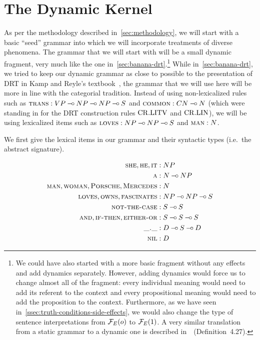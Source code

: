 \minitoc


\section{The Dynamic Kernel}

As per the methodology described in~\ref{sec:methodology}, we will start
with a basic ``seed'' grammar into which we will incorporate treatments of
diverse phenomena. The grammar that we will start with will be a small
dynamic fragment, very much like the one
in~\ref{sec:banana-drt}.\footnote{We could have also started with a more
  basic fragment without any effects and add dynamics separately. However,
  adding dynamics would force us to change almost all of the fragment:
  every individual meaning would need to add its referent to the context
  and every propositional meaning would need to add the proposition to the
  context. Furthermore, as we have seen
  in~\ref{ssec:truth-conditions-side-effects}, we would also change the
  type of sentence interpretations from $\mathcal{F}_E(o)$ to $\mathcal{F}_E(1)$. A very
  similar translation from a static grammar to a dynamic one is described
  in~\cite{lebedeva2012expression}~(Definition~4.27).} While
in~\ref{sec:banana-drt}, we tried to keep our dynamic grammar as close to
possible to the presentation of DRT in Kamp and Reyle's
textbook~\cite{kamp1993discourse}, the grammar that we will use here will
be more in line with the categorial tradition. Instead of using
non-lexicalized rules such as $\textsc{trans} : VP \mathbin{{-}\mkern-3.5mu{\circ}} NP \mathbin{{-}\mkern-3.5mu{\circ}} NP \mathbin{{-}\mkern-3.5mu{\circ}} S$
and $\textsc{common} : CN \mathbin{{-}\mkern-3.5mu{\circ}} N$ (which were standing in for the DRT
construction rules $\mathrm{CR.LITV}$ and $\mathrm{CR.LIN}$), we will be using lexicalized
items such as $\textsc{loves} : NP \mathbin{{-}\mkern-3.5mu{\circ}} NP \mathbin{{-}\mkern-3.5mu{\circ}} S$ and $\textsc{man} : N$.

We first give the lexical items in our grammar and their syntactic types
(i.e.\ the abstract signature).

\begin{align*}
  \textsc{she}, \textsc{he}, \textsc{it} &: NP \\
  \textsc{a} &: N \mathbin{{-}\mkern-3.5mu{\circ}} NP \\
  \textsc{man}, \textsc{woman}, \textsc{Porsche}, \textsc{Mercedes} &: N \\
  \textsc{loves}, \textsc{owns}, \textsc{fascinates} &: NP \mathbin{{-}\mkern-3.5mu{\circ}} NP \mathbin{{-}\mkern-3.5mu{\circ}} S \\
  \textsc{not-the-case} &: S \mathbin{{-}\mkern-3.5mu{\circ}} S \\
  \textsc{and}, \textsc{if-then}, \textsc{either-or} &: S \mathbin{{-}\mkern-3.5mu{\circ}} S \mathbin{{-}\mkern-3.5mu{\circ}} S \\
  \textsc{\_.\_} &: D \mathbin{{-}\mkern-3.5mu{\circ}} S \mathbin{{-}\mkern-3.5mu{\circ}} D \\
  \textsc{nil} &: D
\end{align*}

